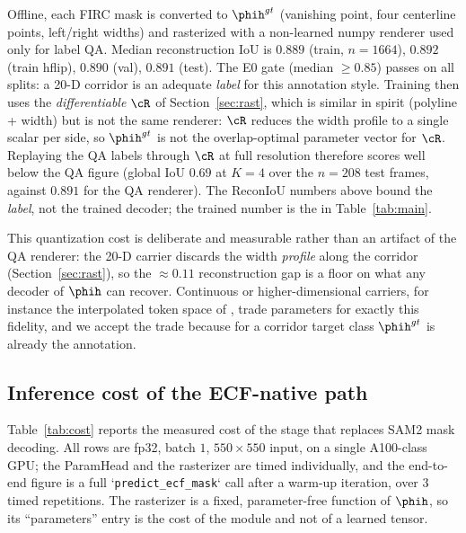 Offline, each FIRC mask is converted to $\phih^{gt}$ (vanishing point, four centerline points, left/right widths) and rasterized with a non-learned numpy renderer used only for label QA.
Median reconstruction IoU is $0.889$ (train, $n{=}1664$), $0.892$ (train hflip), $0.890$ (val), $0.891$ (test).
The E0 gate (median ${\ge}0.85$) passes on all splits: a 20-D corridor is an adequate \emph{label} for this annotation style.
Training then uses the \emph{differentiable} $\cR$ of Section~\ref{sec:rast}, which is similar in spirit (polyline + width) but is not the same renderer: $\cR$ reduces the width profile to a single scalar per side, so $\phih^{gt}$ is not the overlap-optimal parameter vector for $\cR$.
Replaying the QA labels through $\cR$ at full resolution therefore scores well below the QA figure (global IoU $0.69$ at $K{=}4$ over the $n{=}208$ test frames, against $0.891$ for the QA renderer).
The ReconIoU numbers above bound the \emph{label}, not the trained decoder; the trained number is the \gIou{} in Table~\ref{tab:main}.

This quantization cost is deliberate and measurable rather than an artifact of the QA renderer: the 20-D carrier discards the width \emph{profile} along the corridor (Section~\ref{sec:rast}), so the ${\approx}0.11$ reconstruction gap is a floor on what any decoder of $\phih$ can recover.
Continuous or higher-dimensional carriers, for instance the interpolated token space of \citet{li2026momentorpp}, trade parameters for exactly this fidelity, and we accept the trade because for a corridor target class $\phih^{gt}$ is already the annotation.

\subsection{Inference cost of the ECF-native path}
\label{app:cost}

Table~\ref{tab:cost} reports the measured cost of the stage that replaces SAM2 mask decoding.
All rows are fp32, batch $1$, $550{\times}550$ input, on a single A100-class GPU; the ParamHead and the rasterizer are timed individually, and the end-to-end figure is a full `\texttt{predict\_ecf\_mask}` call after a warm-up iteration, over $3$ timed repetitions.
The rasterizer is a fixed, parameter-free function of $\phih$, so its ``parameters'' entry is the cost of the module and not of a learned tensor.

